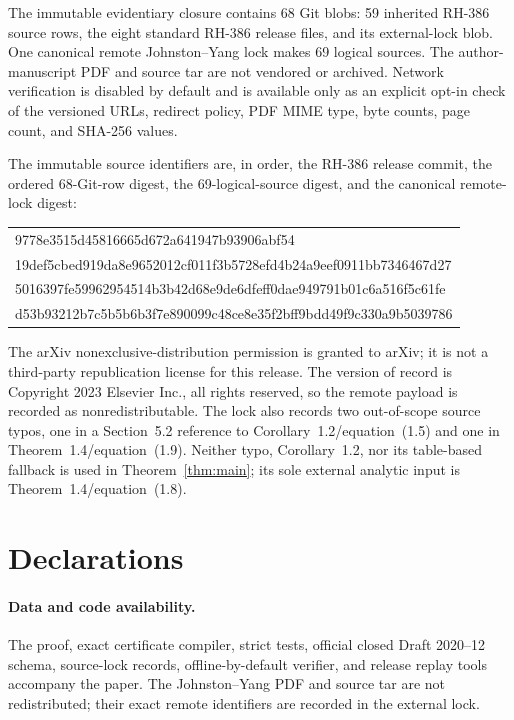 \documentclass[11pt]{article}
\theoremstyle{definition}
\theoremstyle{remark}
\begin{document}
The immutable evidentiary closure contains 68 Git blobs: 59 inherited
RH-386 source rows, the eight standard RH-386 release files, and its
external-lock blob.  One canonical remote Johnston--Yang lock makes 69
logical sources.  The author-manuscript PDF and source tar are not
vendored or archived.  Network verification is disabled by default and
is available only as an explicit opt-in check of the versioned URLs,
redirect policy, PDF MIME type, byte counts, page count, and SHA-256
values.

The immutable source identifiers are, in order, the RH-386 release
commit, the ordered 68-Git-row digest, the 69-logical-source digest, and
the canonical remote-lock digest:
\begin{center}
\small\ttfamily
\begin{tabular}{@{}l@{}}
9778e3515d45816665d672a641947b93906abf54\\
19def5cbed919da8e9652012cf011f3b5728efd4b24a9eef0911bb7346467d27\\
5016397fe59962954514b3b42d68e9de6dfeff0dae949791b01c6a516f5c61fe\\
d53b93212b7c5b5b6b3f7e890099c48ce8e35f2bff9bdd49f9c330a9b5039786
\end{tabular}
\end{center}

The arXiv nonexclusive-distribution permission is granted to arXiv; it is
not a third-party republication license for this release.  The version of
record is Copyright 2023 Elsevier Inc., all rights reserved, so the remote
payload is recorded as nonredistributable.  The lock also records two
out-of-scope source typos, one in a Section~5.2 reference to
Corollary~1.2/equation~(1.5) and one in Theorem~1.4/equation~(1.9).
Neither typo, Corollary~1.2, nor its table-based fallback is used in
Theorem~\ref{thm:main}; its sole external analytic input is
Theorem~1.4/equation~(1.8).

\section*{Declarations}

\paragraph{Data and code availability.}
The proof, exact certificate compiler, strict tests, official closed
Draft 2020--12 schema, source-lock records, offline-by-default verifier,
and release replay tools accompany the paper.  The Johnston--Yang PDF and
source tar are not redistributed; their exact remote identifiers are
recorded in the external lock.
\end{document}
